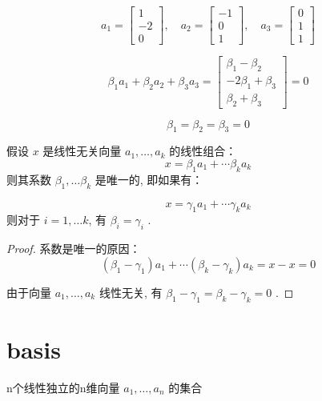 \begin{example}
    $$ a_{1}=\left[\begin{array}{c}1 \\ -2 \\ 0\end{array}\right], \quad a_{2}=\left[\begin{array}{c}-1 \\ 0 \\ 1\end{array}\right], \quad a_{3}=\left[\begin{array}{l}0 \\ 1 \\ 1\end{array}\right] $$

    $$ \beta_{1} a_{1}+\beta_{2} a_{2}+\beta_{3} a_{3}=\left[\begin{array}{c}\beta_{1}-\beta_{2} \\ -2 \beta_{1}+\beta_{3} \\ \beta_{2}+\beta_{3}\end{array}\right]=0 $$

    $$ \beta_{1}=\beta_{2}=\beta_{3}=0 $$
\end{example}

\begin{theorem}
    假设 $ x $ 是线性无关向量 $ a_{1}, \ldots, a_{k} $ 的线性组合：
$$
x=\beta_{1} a_{1}+\cdots \beta_{k} a_{k}
$$
则其系数 $ \beta_{1}, \ldots \beta_{k} $ 是唯一的, 即如果有：

$$
x=\gamma_{1} a_{1}+\cdots \gamma_{k} a_{k}
$$
则对于 $ i=1, \ldots k $, 有 $ \beta_{i}=\gamma_{i} $ . 
\end{theorem}

\begin{proof}
    系数是唯一的原因：
$$
\left(\beta_{1}-\gamma_{1}\right) a_{1}+\cdots\left(\beta_{k}-\gamma_{k}\right) a_{k}=x-x=0
$$

由于向量 $ a_{1}, \ldots, a_{k} $ 线性无关, 有 $ \beta_{1}-\gamma_{1}=\beta_{k}-\gamma_{k}=0 $ . 
\end{proof}

\section{basis}

\begin{definition}[基 (basis)]
    n个线性独立的n维向量 $ a_{1}, \ldots, a_{n} $ 的集合
\end{definition}

